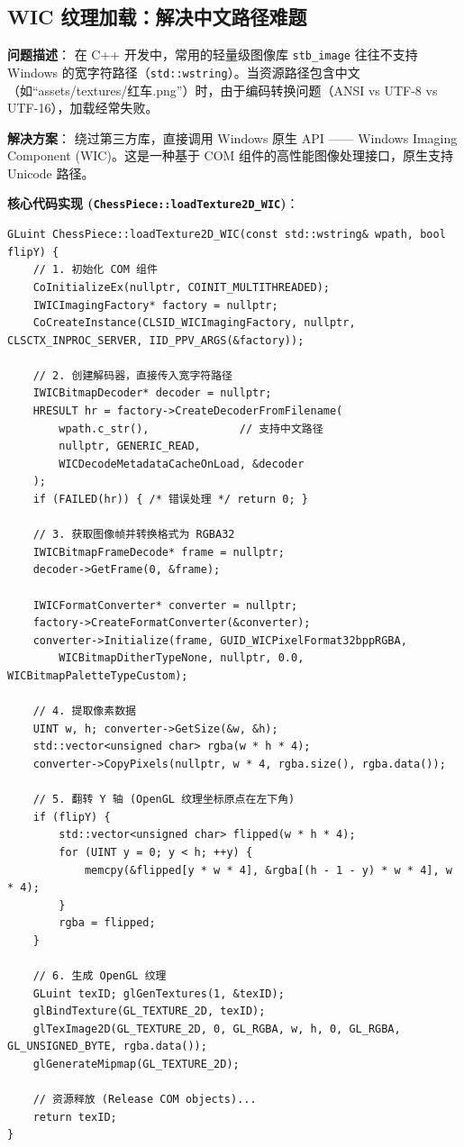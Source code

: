 \documentclass[a4paper]{article}
\begin{document}
\subsection{WIC 纹理加载：解决中文路径难题}

\textbf{问题描述}：
在 C++ 开发中，常用的轻量级图像库 \texttt{stb\_image} 往往不支持 Windows 的宽字符路径（\texttt{std::wstring}）。当资源路径包含中文（如“assets/textures/红车.png”）时，由于编码转换问题（ANSI vs UTF-8 vs UTF-16），加载经常失败。

\textbf{解决方案}：
绕过第三方库，直接调用 Windows 原生 API —— Windows Imaging Component (WIC)。这是一种基于 COM 组件的高性能图像处理接口，原生支持 Unicode 路径。

\textbf{核心代码实现 (\texttt{ChessPiece::loadTexture2D\_WIC})}：

\begin{lstlisting}[caption={基于 WIC 的纹理加载实现}]
GLuint ChessPiece::loadTexture2D_WIC(const std::wstring& wpath, bool flipY) {
    // 1. 初始化 COM 组件
    CoInitializeEx(nullptr, COINIT_MULTITHREADED);
    IWICImagingFactory* factory = nullptr;
    CoCreateInstance(CLSID_WICImagingFactory, nullptr, CLSCTX_INPROC_SERVER, IID_PPV_ARGS(&factory));

    // 2. 创建解码器，直接传入宽字符路径
    IWICBitmapDecoder* decoder = nullptr;
    HRESULT hr = factory->CreateDecoderFromFilename(
        wpath.c_str(),              // 支持中文路径
        nullptr, GENERIC_READ, 
        WICDecodeMetadataCacheOnLoad, &decoder
    );
    if (FAILED(hr)) { /* 错误处理 */ return 0; }

    // 3. 获取图像帧并转换格式为 RGBA32
    IWICBitmapFrameDecode* frame = nullptr;
    decoder->GetFrame(0, &frame);

    IWICFormatConverter* converter = nullptr;
    factory->CreateFormatConverter(&converter);
    converter->Initialize(frame, GUID_WICPixelFormat32bppRGBA, 
        WICBitmapDitherTypeNone, nullptr, 0.0, WICBitmapPaletteTypeCustom);

    // 4. 提取像素数据
    UINT w, h; converter->GetSize(&w, &h);
    std::vector<unsigned char> rgba(w * h * 4);
    converter->CopyPixels(nullptr, w * 4, rgba.size(), rgba.data());

    // 5. 翻转 Y 轴 (OpenGL 纹理坐标原点在左下角)
    if (flipY) {
        std::vector<unsigned char> flipped(w * h * 4);
        for (UINT y = 0; y < h; ++y) {
            memcpy(&flipped[y * w * 4], &rgba[(h - 1 - y) * w * 4], w * 4);
        }
        rgba = flipped;
    }

    // 6. 生成 OpenGL 纹理
    GLuint texID; glGenTextures(1, &texID);
    glBindTexture(GL_TEXTURE_2D, texID);
    glTexImage2D(GL_TEXTURE_2D, 0, GL_RGBA, w, h, 0, GL_RGBA, GL_UNSIGNED_BYTE, rgba.data());
    glGenerateMipmap(GL_TEXTURE_2D);
    
    // 资源释放 (Release COM objects)...
    return texID;
}
\end{lstlisting}
\end{document}
